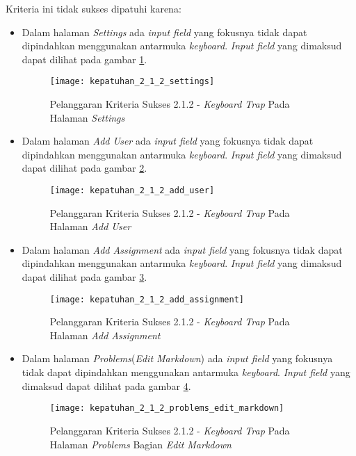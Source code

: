 Kriteria ini tidak sukses dipatuhi karena:
\begin{itemize}
	\item Dalam halaman \textit{Settings} ada \textit{input field} yang fokusnya tidak dapat dipindahkan menggunakan antarmuka \textit{keyboard}. \textit{Input field} yang dimaksud dapat dilihat pada gambar \ref{fig:kepatuhan_2_1_2_settings}.
	\begin{figure}[H]
		\centering  
		\texttt{[image: kepatuhan\_2\_1\_2\_settings]}  
		\caption[Pelanggaran Kriteria Sukses 2.1.2 - \textit{Keyboard Trap} Pada Halaman \textit{Settings}]{Pelanggaran Kriteria Sukses 2.1.2 - \textit{Keyboard Trap} Pada Halaman \textit{Settings}} 
		\label{fig:kepatuhan_2_1_2_settings} 
	\end{figure}

	\item Dalam halaman \textit{Add User} ada \textit{input field} yang fokusnya tidak dapat dipindahkan menggunakan antarmuka \textit{keyboard}. \textit{Input field} yang dimaksud dapat dilihat pada gambar \ref{fig:kepatuhan_2_1_2_add_user}.
	\begin{figure}[H]
		\centering  
		\texttt{[image: kepatuhan\_2\_1\_2\_add\_user]}  
		\caption[Pelanggaran Kriteria Sukses 2.1.2 - \textit{Keyboard Trap} Pada Halaman \textit{Add User}]{Pelanggaran Kriteria Sukses 2.1.2 - \textit{Keyboard Trap} Pada Halaman \textit{Add User}} 
		\label{fig:kepatuhan_2_1_2_add_user} 
	\end{figure}

	\item Dalam halaman \textit{Add Assignment} ada \textit{input field} yang fokusnya tidak dapat dipindahkan menggunakan antarmuka \textit{keyboard}. \textit{Input field} yang dimaksud dapat dilihat pada gambar \ref{fig:kepatuhan_2_1_2_add_assignment}.
	\begin{figure}[H]
		\centering  
		\texttt{[image: kepatuhan\_2\_1\_2\_add\_assignment]}  
		\caption[Pelanggaran Kriteria Sukses 2.1.2 - \textit{Keyboard Trap} Pada Halaman \textit{Add Assignment}]{Pelanggaran Kriteria Sukses 2.1.2 - \textit{Keyboard Trap} Pada Halaman \textit{Add Assignment}} 
		\label{fig:kepatuhan_2_1_2_add_assignment} 
	\end{figure}

	\item Dalam halaman \textit{Problems}(\textit{Edit Markdown}) ada \textit{input field} yang fokusnya tidak dapat dipindahkan menggunakan antarmuka \textit{keyboard}. \textit{Input field} yang dimaksud dapat dilihat pada gambar \ref{fig:kepatuhan_2_1_2_problems_edit_markdown}.
	\begin{figure}[H]
		\centering  
		\texttt{[image: kepatuhan\_2\_1\_2\_problems\_edit\_markdown]}  
		\caption[Pelanggaran Kriteria Sukses 2.1.2 - \textit{Keyboard Trap} Pada Halaman \textit{Problems} Bagian \textit{Edit Markdown}]{Pelanggaran Kriteria Sukses 2.1.2 - \textit{Keyboard Trap} Pada Halaman \textit{Problems} Bagian \textit{Edit Markdown}} 
		\label{fig:kepatuhan_2_1_2_problems_edit_markdown} 
	\end{figure}

\end{itemize}

